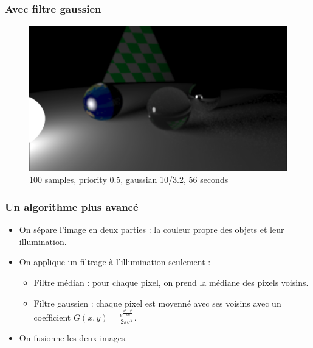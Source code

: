 \documentclass[handout]{beamer}
\begin{document}
\begin{frame}
    \frametitle{Avec filtre gaussien}

    \begin{figure}
        \includegraphics[scale=0.25]{gaussian10.png}
        \caption{100 samples, priority 0.5, gaussian 10/3.2, 56 seconds}
    \end{figure}

\end{frame}

\begin{frame}
    \frametitle{Un algorithme plus avancé}

    \begin{itemize}
        \item On sépare l'image en deux parties : la couleur propre des objets et leur illumination.
        \item On applique un filtrage à l'illumination seulement  :
        \begin{itemize}
            \item Filtre médian : pour chaque pixel, on prend la médiane des pixels voisins.
            \item Filtre gaussien : chaque pixel est moyenné avec ses voisins avec un coefficient
                $ G(x,y) = \frac{ e^{ \frac{x^2+y^2}{2 \sigma^2} } }{2 \pi \sigma^2} $.
        \end{itemize}
        \item On fusionne les deux images.
    \end{itemize}

\end{frame}
\end{document}
